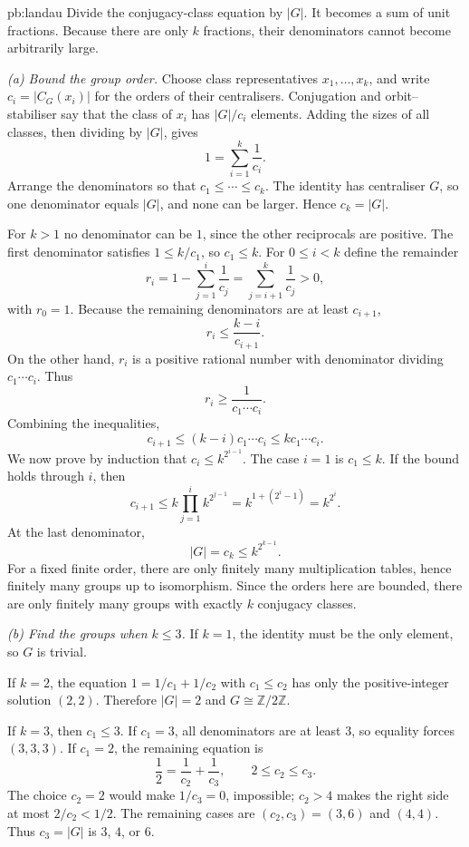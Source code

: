 \begin{solution}{pb:landau}
\idea Divide the conjugacy-class equation by $|G|$. It becomes a sum of unit fractions. Because there are only $k$ fractions, their denominators cannot become arbitrarily large.

\writeup \emph{(a) Bound the group order.}
Choose class representatives $x_1,\ldots,x_k$, and write $c_i=|C_G(x_i)|$ for the orders of their centralisers. Conjugation and orbit--stabiliser say that the class of $x_i$ has $|G|/c_i$ elements. Adding the sizes of all classes, then dividing by $|G|$, gives
\[
1=\sum_{i=1}^k\frac1{c_i}.
\]
Arrange the denominators so that $c_1\le\cdots\le c_k$. The identity has centraliser $G$, so one denominator equals $|G|$, and none can be larger. Hence $c_k=|G|$.

For $k>1$ no denominator can be $1$, since the other reciprocals are positive. The first denominator satisfies $1\le k/c_1$, so $c_1\le k$. For $0\le i<k$ define the remainder
\[
r_i=1-\sum_{j=1}^i\frac1{c_j}
    =\sum_{j=i+1}^k\frac1{c_j}>0,
\]
with $r_0=1$. Because the remaining denominators are at least $c_{i+1}$,
\[
r_i\le\frac{k-i}{c_{i+1}}.
\]
On the other hand, $r_i$ is a positive rational number with denominator dividing $c_1\cdots c_i$. Thus
\[
r_i\ge\frac1{c_1\cdots c_i}.
\]
Combining the inequalities,
\[
c_{i+1}\le(k-i)c_1\cdots c_i
          \le k c_1\cdots c_i.
\]
We now prove by induction that $c_i\le k^{2^{i-1}}$. The case $i=1$ is $c_1\le k$. If the bound holds through $i$, then
\[
c_{i+1}\le k\prod_{j=1}^i k^{2^{j-1}}
=k^{1+(2^i-1)}=k^{2^i}.
\]
At the last denominator,
\[
\boxed{|G|=c_k\le k^{2^{k-1}}.}
\]
For a fixed finite order, there are only finitely many multiplication tables, hence finitely many groups up to isomorphism. Since the orders here are bounded, there are only finitely many groups with exactly $k$ conjugacy classes.

\emph{(b) Find the groups when $k\le3$.}
If $k=1$, the identity must be the only element, so $G$ is trivial.

If $k=2$, the equation $1=1/c_1+1/c_2$ with $c_1\le c_2$ has only the positive-integer solution $(2,2)$. Therefore $|G|=2$ and $G\cong\mathbb Z/2\mathbb Z$.

If $k=3$, then $c_1\le3$. If $c_1=3$, all denominators are at least $3$, so equality forces $(3,3,3)$. If $c_1=2$, the remaining equation is
\[
\frac12=\frac1{c_2}+\frac1{c_3},
\qquad 2\le c_2\le c_3.
\]
The choice $c_2=2$ would make $1/c_3=0$, impossible; $c_2>4$ makes the right side at most $2/c_2<1/2$. The remaining cases are $(c_2,c_3)=(3,6)$ and $(4,4)$. Thus $c_3=|G|$ is $3$, $4$, or $6$.


\end{solution}

